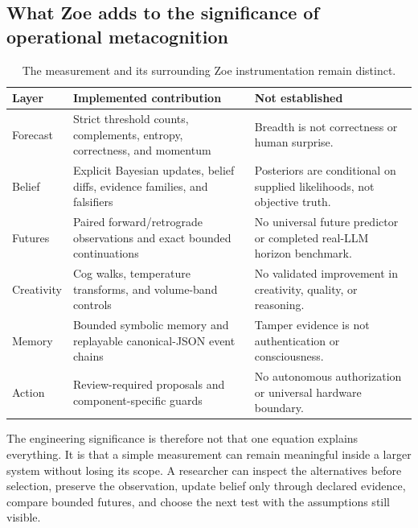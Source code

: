 \documentclass[11pt,a4paper]{article}
\begin{document}
\subsection{What Zoe adds to the significance of operational metacognition}
\begin{table}[htbp]
\centering
\caption{The measurement and its surrounding Zoe instrumentation remain distinct.}
\label{tab:zoe-significance-contributions}
{\scriptsize
\begin{tabular}{p{2.6cm}p{5.5cm}p{6.0cm}}
\toprule
Layer & Implemented contribution & Not established \\
\midrule
Forecast & Strict threshold counts, complements, entropy, correctness, and momentum & Breadth is not correctness or human surprise. \\
Belief & Explicit Bayesian updates, belief diffs, evidence families, and falsifiers & Posteriors are conditional on supplied likelihoods, not objective truth. \\
Futures & Paired forward/retrograde observations and exact bounded continuations & No universal future predictor or completed real-LLM horizon benchmark. \\
Creativity & Cog walks, temperature transforms, and volume-band controls & No validated improvement in creativity, quality, or reasoning. \\
Memory & Bounded symbolic memory and replayable canonical-JSON event chains & Tamper evidence is not authentication or consciousness. \\
Action & Review-required proposals and component-specific guards & No autonomous authorization or universal hardware boundary. \\
\bottomrule
\end{tabular}
}
\end{table}

The engineering significance is therefore not that one equation explains everything. It is that a simple measurement can remain meaningful inside a larger system without losing its scope. A researcher can inspect the alternatives before selection, preserve the observation, update belief only through declared evidence, compare bounded futures, and choose the next test with the assumptions still visible.
\end{document}
